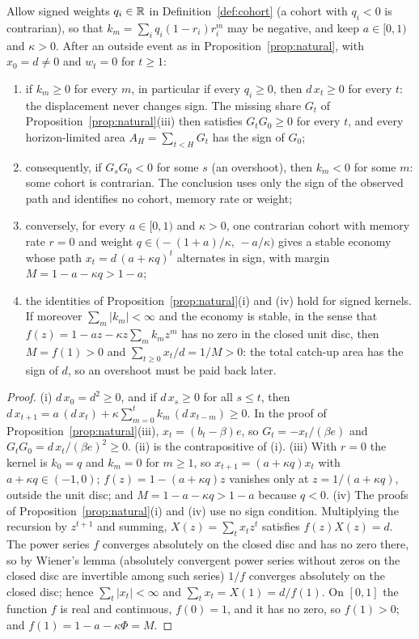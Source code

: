 \begin{proposition}\label{prop:overshoot}
Allow signed weights $q_i\in\mathbb{R}$ in Definition~\ref{def:cohort} (a cohort with $q_i<0$ is contrarian), so that $k_m=\sum_iq_i(1-r_i)r_i^m$ may be negative, and keep $a\in[0,1)$ and $\kappa>0$. After an outside event as in Proposition~\ref{prop:natural}, with $x_0=d\neq0$ and $w_t=0$ for $t\ge1$:
\begin{enumerate}[label=(\roman*)]
\item if $k_m\ge0$ for every $m$, in particular if every $q_i\ge0$, then $d\,x_t\ge0$ for every $t$: the displacement never changes sign. The missing share $G_t$ of Proposition~\ref{prop:natural}(iii) then satisfies $G_tG_0\ge0$ for every $t$, and every horizon-limited area $A_H=\sum_{t<H}G_t$ has the sign of $G_0$;
\item consequently, if $G_sG_0<0$ for some $s$ (an overshoot), then $k_m<0$ for some $m$: some cohort is contrarian. The conclusion uses only the sign of the observed path and identifies no cohort, memory rate or weight;
\item conversely, for every $a\in[0,1)$ and $\kappa>0$, one contrarian cohort with memory rate $r=0$ and weight $q\in\big(-(1+a)/\kappa,\,-a/\kappa\big)$ gives a stable economy whose path $x_t=d\,(a+\kappa q)^t$ alternates in sign, with margin $M=1-a-\kappa q>1-a$;
\item the identities of Proposition~\ref{prop:natural}(i) and (iv) hold for signed kernels. If moreover $\sum_m|k_m|<\infty$ and the economy is stable, in the sense that $f(z)=1-az-\kappa z\sum_mk_mz^m$ has no zero in the closed unit disc, then $M=f(1)>0$ and $\sum_{t\ge0}x_t/d=1/M>0$: the total catch-up area has the sign of $d$, so an overshoot must be paid back later.
\end{enumerate}
\hfill\Proved
\end{proposition}

\begin{proof}
(i) $d\,x_0=d^2\ge0$, and if $d\,x_s\ge0$ for all $s\le t$, then $d\,x_{t+1}=a\,(d\,x_t)+\kappa\sum_{m=0}^tk_m\,(d\,x_{t-m})\ge0$. In the proof of Proposition~\ref{prop:natural}(iii), $x_t=(b_t-\beta)e$, so $G_t=-x_t/(\beta e)$ and $G_tG_0=d\,x_t/(\beta e)^2\ge0$. (ii) is the contrapositive of (i). (iii) With $r=0$ the kernel is $k_0=q$ and $k_m=0$ for $m\ge1$, so $x_{t+1}=(a+\kappa q)x_t$ with $a+\kappa q\in(-1,0)$; $f(z)=1-(a+\kappa q)z$ vanishes only at $z=1/(a+\kappa q)$, outside the unit disc; and $M=1-a-\kappa q>1-a$ because $q<0$. (iv) The proofs of Proposition~\ref{prop:natural}(i) and (iv) use no sign condition. Multiplying the recursion by $z^{t+1}$ and summing, $X(z)=\sum_tx_tz^t$ satisfies $f(z)X(z)=d$. The power series $f$ converges absolutely on the closed disc and has no zero there, so by Wiener's lemma (absolutely convergent power series without zeros on the closed disc are invertible among such series) $1/f$ converges absolutely on the closed disc; hence $\sum_t|x_t|<\infty$ and $\sum_tx_t=X(1)=d/f(1)$. On $[0,1]$ the function $f$ is real and continuous, $f(0)=1$, and it has no zero, so $f(1)>0$; and $f(1)=1-a-\kappa\Phi=M$.
\end{proof}

